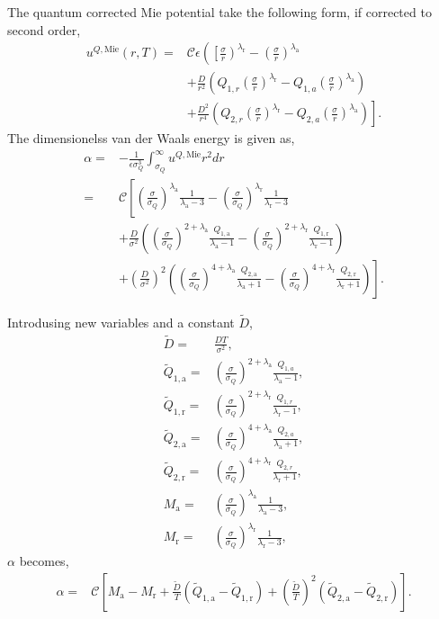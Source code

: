 \documentclass[english]{../thermomemo/thermomemo}
\newcommand*{\lb}{\left(}
\newcommand*{\rb}{\right)}
\newcommand{\mie}{\text{Mie}\xspace}
\newcommand{\lama}{\ensuremath{{\lambda_{\text{a}}}}\xspace}
\newcommand{\lamr}{\ensuremath{{\lambda_{\text{r}}}}\xspace}
\newcommand{\Dt}{\ensuremath{\tilde{D}}\xspace}
\newcommand{\Qt}{\ensuremath{\tilde{Q}}\xspace}
\newcommand{\att}{\ensuremath{\text{a}}\xspace}
\newcommand{\rep}{\ensuremath{\text{r}}\xspace}
\begin{document}
The quantum corrected Mie potential take the following form, if corrected to second order,
\begin{align}
  \label{eq:Mie_Quantum}
  u^{Q,\mie}\lb r, T\rb =& \mathcal{C}\epsilon \lb \left[\frac{\sigma}{r} \rb^\lamr - \lb\frac{\sigma}{r} \rb^\lama  \right. \nonumber \\  & + \frac{D}{r^2} \lb Q_{1,r}\lb\frac{\sigma}{r}\rb^\lamr - Q_{1,a}\lb\frac{\sigma}{r}\rb^\lama\rb \nonumber \\  &\left. + \frac{D^2}{r^4} \lb Q_{2,r}\lb\frac{\sigma}{r}\rb^\lamr - Q_{2,a}\lb\frac{\sigma}{r}\rb^\lama  \rb \right].
\end{align}
The dimensionelss van der Waals energy is given as,
\begin{align}
  \label{eq:van_der_Walls_energy}
  \alpha =& -\frac{1}{\epsilon \sigma_{Q}^3} \int_{\sigma_{Q}}^{\infty} u^{Q,\mie} r^2  dr \\
   =& \mathcal{C} \left[ \lb\frac{\sigma}{\sigma_{Q}}\rb^\lama \frac{1}{\lama - 3} - \lb\frac{\sigma}{\sigma_{Q}}\rb^\lamr\frac{1}{\lamr - 3}  \right. \nonumber \\& + \frac{D}{\sigma^2} \lb \lb\frac{\sigma}{\sigma_{Q}}\rb^{2+\lama}\frac{Q_{1,\att}}{\lama - 1} - \lb\frac{\sigma}{\sigma_{Q}}\rb^{2+\lamr}\frac{Q_{1,\rep}}{\lamr - 1}\rb \nonumber \\ &\left. + \lb\frac{D}{\sigma^2}\rb^2 \lb \lb\frac{\sigma}{\sigma_{Q}}\rb^{4+\lama}\frac{Q_{2,\att}}{\lama + 1} - \lb\frac{\sigma}{\sigma_{Q}}\rb^{4+\lamr}\frac{Q_{2,\rep}}{\lamr + 1}\rb\right].
\end{align}

Introdusing new variables and a constant  $\Dt$,
\begin{align}
  \label{eq:Mie_Quantum_2}
  \Dt =& \frac{D T}{\sigma^2},\\
  \Qt_{1,\att} =& \lb\frac{\sigma}{\sigma_{Q}}\rb^{2+\lama}\frac{Q_{1,a}}{\lama - 1}, \\
  \Qt_{1,\rep} =& \lb\frac{\sigma}{\sigma_{Q}}\rb^{2+\lamr}\frac{Q_{1,r}}{\lamr - 1}, \\
  \Qt_{2,\att} =& \lb\frac{\sigma}{\sigma_{Q}}\rb^{4+\lama}\frac{Q_{2,a}}{\lama + 1}, \\
  \Qt_{2,\rep} =& \lb\frac{\sigma}{\sigma_{Q}}\rb^{4+\lamr}\frac{Q_{2,r}}{\lamr + 1}, \\
  M_{\att} =& \lb\frac{\sigma}{\sigma_{Q}}\rb^{\lama}\frac{1}{\lama - 3}, \\
  M_{\rep} =& \lb\frac{\sigma}{\sigma_{Q}}\rb^{\lamr}\frac{1}{\lamr - 3},
\end{align}
$\alpha$ becomes,
\begin{align}
  \label{eq:van_der_Walls_energy_2}
  \alpha =& \mathcal{C} \left[ M_{\att} - M_{\rep} + \frac{\Dt}{T} \lb \Qt_{1,\att} - \Qt_{1,\rep}\rb  + \lb\frac{\Dt}{T}\rb^2 \lb \Qt_{2,\att} - \Qt_{2,\rep}\rb\right].
\end{align}
\end{document}
